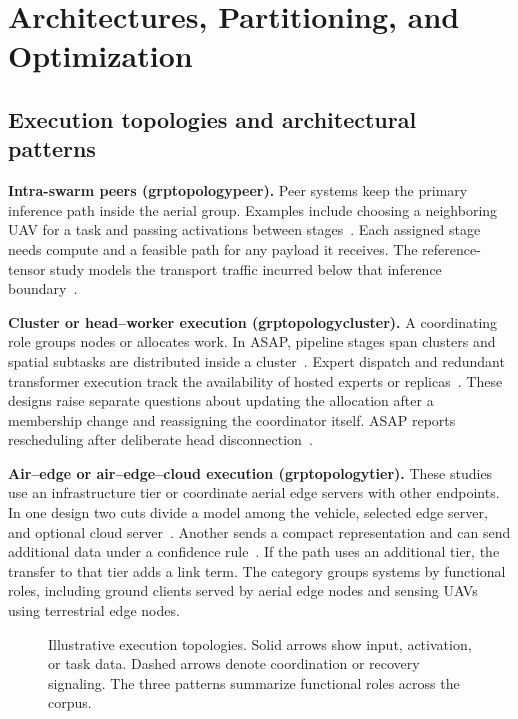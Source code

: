 \documentclass[pdflatex,sn-vancouver-num]{sn-jnl}
\newcommand{\groupcite}[2]{\csname grp#1#2\endcsname}
\begin{document}
\section{Architectures, Partitioning, and Optimization}\label{sec:architecture}
\subsection{Execution topologies and architectural patterns}
\textbf{Intra-swarm peers (\groupcite{topology}{peer}).}
Peer systems keep the primary inference path inside the aerial group. Examples include choosing a neighboring UAV for a task and passing activations between stages~\cite{R0010,R0092}. Each assigned stage needs compute and a feasible path for any payload it receives. The reference-tensor study models the transport traffic incurred below that inference boundary~\cite{R0121}.

\textbf{Cluster or head--worker execution (\groupcite{topology}{cluster}).}
A coordinating role groups nodes or allocates work. In ASAP, pipeline stages span clusters and spatial subtasks are distributed inside a cluster~\cite{R0014}. Expert dispatch and redundant transformer execution track the availability of hosted experts or replicas~\cite{R0110,R0118}. These designs raise separate questions about updating the allocation after a membership change and reassigning the coordinator itself. ASAP reports rescheduling after deliberate head disconnection~\cite{R0014}.

\textbf{Air--edge or air--edge--cloud execution (\groupcite{topology}{tier}).}
These studies use an infrastructure tier or coordinate aerial edge servers with other endpoints. In one design two cuts divide a model among the vehicle, selected edge server, and optional cloud server~\cite{R0001}. Another sends a compact representation and can send additional data under a confidence rule~\cite{R0080}. If the path uses an additional tier, the transfer to that tier adds a link term. The category groups systems by functional roles, including ground clients served by aerial edge nodes and sensing UAVs using terrestrial edge nodes.

\begin{figure}[htbp]
\centering

\caption{Illustrative execution topologies. Solid arrows show input, activation, or task data. Dashed arrows denote coordination or recovery signaling. The three patterns summarize functional roles across the corpus.}\label{fig:topologies}
\end{figure}
\end{document}
